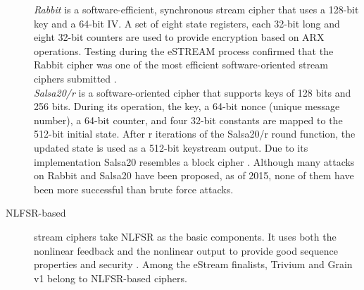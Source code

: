 \begin{description}
		\emph{Rabbit} is a software-efficient, synchronous stream cipher that uses a 128-bit key and a 64-bit IV. A set of eight state registers, each 32-bit long and eight 32-bit counters are used to provide encryption based on ARX operations. Testing during the eSTREAM process confirmed that the Rabbit cipher was one of the most efficient software-oriented stream ciphers submitted \cite{boesgaard2008rabbit}.\\
		\emph{Salsa20/r} is a software-oriented cipher that supports keys of 128 bits and 256 bits. During its operation, the key, a 64-bit nonce (unique message number), a 64-bit counter, and four 32-bit constants are mapped to the 512-bit initial state. After r iterations of the Salsa20/r round function, the updated state is used as a 512-bit keystream output. Due to its implementation Salsa20 resembles a block cipher \cite{bernstein2008salsa20}.
		Although many attacks on Rabbit and Salsa20 have been proposed, as of 2015, none of them have been more successful than brute force attacks. 
		\item [NLFSR-based] stream ciphers take NLFSR as the basic components. It uses both the nonlinear feedback and the nonlinear output to provide good sequence properties and security \cite{jiao2020stream}. 
		Among the eStream finalists, Trivium and Grain v1 belong to NLFSR-based ciphers.
		
		\begin{figure}[h]
			

\end{figure}
\end{description}
